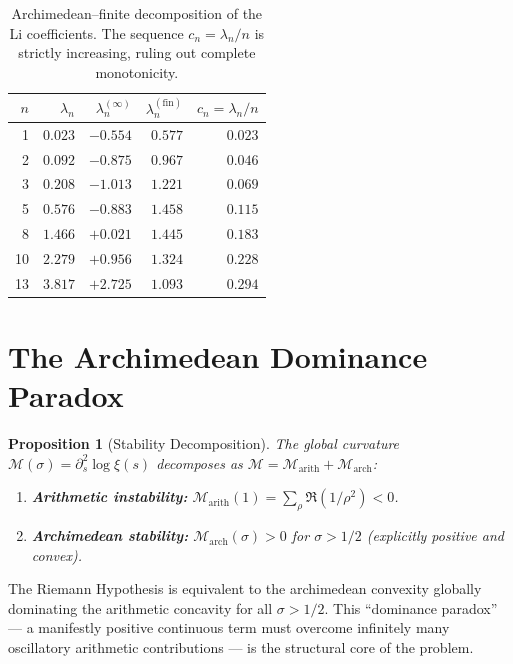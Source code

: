 \documentclass[12pt,a4paper]{article}
\newtheorem{proposition}[theorem]{Proposition}
\theoremstyle{definition}
\theoremstyle{remark}
\begin{document}
\begin{table}[h]
\centering
\renewcommand{\arraystretch}{1.15}
\begin{tabular}{r|r|r|r|r}
$n$ & $\lambda_n$ & $\lambda_n^{(\infty)}$ & $\lambda_n^{(\mathrm{fin})}$ & $c_n = \lambda_n/n$ \\\hline
1 & $0.023$ & $-0.554$ & $0.577$ & $0.023$ \\
2 & $0.092$ & $-0.875$ & $0.967$ & $0.046$ \\
3 & $0.208$ & $-1.013$ & $1.221$ & $0.069$ \\
5 & $0.576$ & $-0.883$ & $1.458$ & $0.115$ \\
8 & $1.466$ & $+0.021$ & $1.445$ & $0.183$ \\
10 & $2.279$ & $+0.956$ & $1.324$ & $0.228$ \\
13 & $3.817$ & $+2.725$ & $1.093$ & $0.294$ \\
\end{tabular}
\caption{Archimedean--finite decomposition of the Li coefficients. The sequence $c_n = \lambda_n/n$ is strictly increasing, ruling out complete monotonicity.}
\label{tab:li-coefficients}
\end{table}


\section{The Archimedean Dominance Paradox}
\label{sec:dominance}

\begin{proposition}[Stability Decomposition]
\label{prop:stability}
The global curvature $\mathcal{M}(\sigma) = \partial_s^2\log\xi(s)$ decomposes as $\mathcal{M} = \mathcal{M}_{\mathrm{arith}} + \mathcal{M}_{\mathrm{arch}}$:
\begin{enumerate}
  \item \textbf{Arithmetic instability:} $\mathcal{M}_{\mathrm{arith}}(1) = \sum_\rho \Re(1/\rho^2) < 0$.
  \item \textbf{Archimedean stability:} $\mathcal{M}_{\mathrm{arch}}(\sigma) > 0$ for $\sigma > 1/2$ (explicitly positive and convex).
\end{enumerate}
\end{proposition}

\noindent The Riemann Hypothesis is equivalent to the archimedean convexity globally dominating the arithmetic concavity for all $\sigma > 1/2$. This ``dominance paradox'' --- a manifestly positive continuous term must overcome infinitely many oscillatory arithmetic contributions --- is the structural core of the problem.
\end{document}
